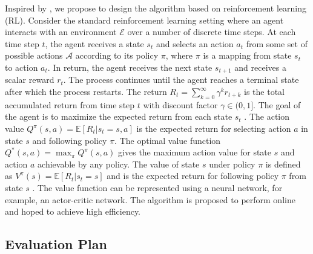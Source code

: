 \documentclass{article}
\begin{document}
Inspired by \cite{Pensieve}, we propose to design the algorithm based on reinforcement learning (RL). Consider the standard reinforcement learning setting where an agent interacts with an environment $\mathcal{E}$ over a number of discrete time steps. At each time step $t$, the agent receives a state $s_t$ and selects an action $a_t$ from some set of possible actions $\mathcal{A}$ according to its policy $\pi$, where $\pi$ is a mapping from state $s_t$ to action $a_t$. In return, the agent receives the next state $s_{t+1}$ and receives a scalar reward $r_t$. The process continues until the agent reaches a terminal state after which the process restarts. The return $R_t=\sum_{k=0}^{\infty}\gamma^k r_{t+k}$ is the total accumulated return from time step $t$ with discount factor $\gamma\in(0,1]$. The goal of the agent is to maximize the expected return from each state $s_t$ \cite{rl-intro}. The action value $Q^{\pi}(s,a)=\mathbb{E}[R_t|s_t=s,a]$ is the expected return for selecting action $a$ in state $s$ and following policy $\pi$. The optimal value function $Q^*(s,a)=\max_{\pi}Q^{\pi}(s,a)$ gives the maximum action value for state $s$ and action $a$ achievable by any policy. The value of state $s$ under policy $\pi$ is defined as $V^{\pi}(s)=\mathbb{E}[R_t|s_t=s]$ and is the expected return for following policy $\pi$ from state $s$ \cite{DBLP:journals/corr/MnihBMGLHSK16}. The value function can be represented using a neural network, for example, an actor-critic network. The algorithm is proposed to perform online and hoped to achieve high efficiency.



  \subsection{Evaluation Plan}
\end{document}
